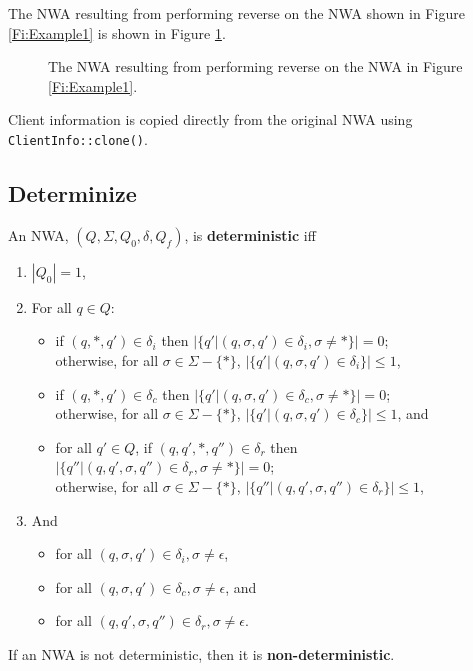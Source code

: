 The NWA resulting from performing reverse on the NWA shown in
Figure \ref{Fi:Example1} is shown in Figure \ref{Fi:Reverse1}.
 
\begin{figure}[p]
  \centering
  \caption{The NWA resulting from performing reverse on the NWA in Figure \ref{Fi:Example1}.}
  \label{Fi:Reverse1}
\end{figure}

Client
information is copied directly from the original NWA using
\texttt{ClientInfo::clone()}.

\subsection{Determinize}
\label{Se:Determinize}

\begin{definition}
An NWA, $(Q,\Sigma,Q_0,\delta,Q_f)$, is \textbf{deterministic} iff 

\begin{enumerate} 

\item $|Q_0| = 1$, 

\item For all $q \in Q$: 
  \begin{itemize}
    \item if $(q,*,q') \in \delta_i$ then $|\{q'|(q,\sigma,q') \in
      \delta_i, {\sigma\neq*}\}| = 0$; \\ otherwise, for all $\sigma \in \Sigma - \{*\}$,
      $|\{q'|(q,\sigma,q') \in \delta_i\}| \leq 1$,

    \item if $(q,*,q') \in \delta_c$ then $ |\{q'|(q,\sigma,q') \in
      \delta_c, {\sigma\neq*}\}| = 0$;\\
      otherwise, for all $\sigma \in \Sigma - \{*\}$,
      $|\{q'|(q,\sigma,q') \in \delta_c\}| \leq 1$, and

    \item for all $q' \in Q$, if $(q,q',*,q'') \in \delta_r$ then
      $|\{q''|(q,q',\sigma,q'') \in \delta_r, {\sigma\neq*}\}| = 0$; \\
      otherwise, for all
      $\sigma \in \Sigma - \{*\}$, $|\{q''|(q,q',\sigma,q'') \in \delta_r\}|
      \leq 1$,
  \end{itemize}
\item And
 \begin{itemize}
   \item for all $(q,\sigma,q') \in \delta_i, \sigma \neq \epsilon$,
   \item for all $(q,\sigma,q') \in \delta_c, \sigma \neq \epsilon$, and
   \item for all $(q,q',\sigma,q'') \in \delta_r, \sigma \neq \epsilon$.
 \end{itemize}
\end{enumerate}
If an NWA is not deterministic, then it is \textbf{non-deterministic}.
\end{definition}


